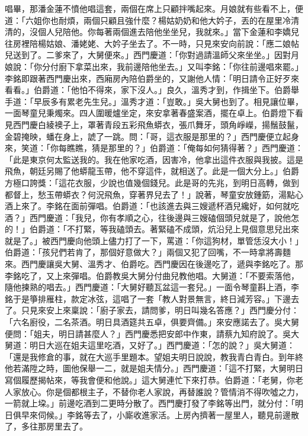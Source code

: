 \begin{showcontents}{}
唱畢，那潘金蓮不憤他唱這套，兩個在席上只顧拌嘴起來。月娘就有些看不上，便道：「六姐你也耐煩，兩個只顧且強什麼？楊姑奶奶和他大妗子，丟的在屋里冷清清的，沒個人兒陪他。你每著兩個進去陪他坐坐兒，我就來。」當下金蓮和李嬌兒往房裡陪楊姑娘、潘姥姥、大妗子坐去了。不一時，只見來安向前說：「應二娘帖兒送到了。二爹來了，大舅便來。」西門慶道：「你對過請溫師父來坐坐。」因對月娘說：「你分付廚下拿菜出來，我前邊陪他坐去。」又叫李銘：「你往前邊唱來罷。」李銘即跟著西門慶出來，西廂房內陪伯爵坐的，又謝他人情：「明日請令正好歹來看看。」伯爵道：「他怕不得來，家下沒人。」良久，溫秀才到，作揖坐下。伯爵舉手道：「早辰多有累老先生兒。」溫秀才道：「豈敢。」吳大舅也到了。相見讓位畢，一面琴童兒秉燭來。四人圍暖爐坐定，來安拿著春盛案酒，擺在卓上。伯爵燈下看見西門慶白綾襖子上，罩著青段五彩飛魚蟒衣，張爪舞牙，頭角崢嶸，揚鬚鼓鬣，金碧掩映，蟠在身上，諕了一跳。問：「哥，這衣服是那里的？」西門慶便立起身來，笑道：「你每瞧瞧，猜是那里的？」伯爵道：「俺每如何猜得著？」西門慶道：「此是東京何太監送我的。我在他家吃酒，因害冷，他拿出這件衣服與我披。這是飛魚，朝廷另賜了他蟒龍玉帶，他不穿這件，就相送了。此是一個大分上。」伯爵方極口誇獎：「這花衣服，少說也值幾個錢兒。此是哥的先兆，到明日高轉，做到都督上，愁玉帶蟒衣？何況飛魚，穿著界兒去了！」說著，琴童安放鍾筯，湯點心酒上來了。李銘在面前彈唱。伯爵道：「也該進去與三嫂遞杯酒兒纔好，如何就吃酒？」西門慶道：「我兒，你有孝順之心，往後邊與三嫂磕個頭兒就是了，說他怎的！」伯爵道：「不打緊，等我磕頭去。著緊磕不成頭，炕沿兒上見個意思兒出來就是了。」被西門慶向他頭上儘力打了一下，罵道：「你這狗材，單管恁沒大小！」伯爵道：「孩兒們若肯了，那個好意做大？」兩個又犯了回嘴，不一時拿將壽麵來。西門慶讓吳大舅、溫秀才、伯爵吃。西門慶因在後邊吃了，遞與李銘吃了。那李銘吃了，又上來彈唱。伯爵教吳大舅分付曲兒教他唱。大舅道：「不要索落他，隨他揀熟的唱去。」西門慶道：「大舅好聽瓦盆這一套兒。」一面令琴童斟上酒，李銘于是箏排雁柱，款定冰弦，這唱了一套「教人對景無言，終日減芳容。」下邊去了。只見來安上來稟說：「廚子家去，請問爹，明日叫幾名答應？」西門慶分付：「六名廚役，二名茶酒。明日具酒筵共五卓，俱要齊備。」來安應諾去了。吳大舅便問：「姐夫，明日請甚麼人？」西門慶悉把安郎中作東，請蔡九知府說了。吳大舅道：明日大巡在姐夫這里吃酒，又好了。」西門慶道：「怎的說？」吳大舅道：「還是我修倉的事，就在大巡手里題本。望姐夫明日說說，教我青白青白。到年終他若滿陞之時，圖他保舉一二，就是姐夫情分。」西門慶道：「這不打緊，大舅明日寫個履歷揭帖來，等我會便和他說。」這大舅連忙下來打恭。伯爵道：「老舅，你老人家放心。你是個都根主子，不替你老人家說，再替誰說？管情消不得吹噓之力，一箭就上垜。」前邊吃酒到二更時分散了。西門慶打發了李銘等出門，就分付：「明日俱早來伺候。」李銘等去了，小廝收進家活。上房內擠著一屋里人，聽見前邊散了，多往那房里去了。


\end{showcontents}
